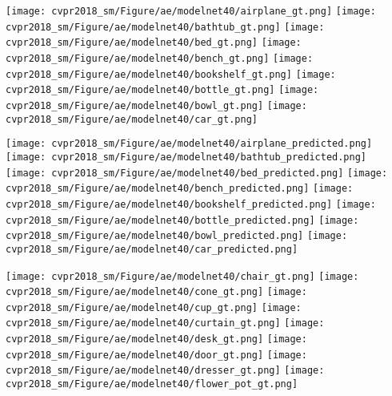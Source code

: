 \documentclass[10pt,twocolumn,letterpaper]{article}
\begin{document}
\begin{figure*}[t] 
        \centering
        
        \texttt{[image: cvpr2018\_sm/Figure/ae/modelnet40/airplane\_gt.png]}
        \texttt{[image: cvpr2018\_sm/Figure/ae/modelnet40/bathtub\_gt.png]}
        \texttt{[image: cvpr2018\_sm/Figure/ae/modelnet40/bed\_gt.png]}
        \texttt{[image: cvpr2018\_sm/Figure/ae/modelnet40/bench\_gt.png]}
        \texttt{[image: cvpr2018\_sm/Figure/ae/modelnet40/bookshelf\_gt.png]}
        \texttt{[image: cvpr2018\_sm/Figure/ae/modelnet40/bottle\_gt.png]}
        \texttt{[image: cvpr2018\_sm/Figure/ae/modelnet40/bowl\_gt.png]}
        \texttt{[image: cvpr2018\_sm/Figure/ae/modelnet40/car\_gt.png]}
        
        \texttt{[image: cvpr2018\_sm/Figure/ae/modelnet40/airplane\_predicted.png]}
        \texttt{[image: cvpr2018\_sm/Figure/ae/modelnet40/bathtub\_predicted.png]}
        \texttt{[image: cvpr2018\_sm/Figure/ae/modelnet40/bed\_predicted.png]}
        \texttt{[image: cvpr2018\_sm/Figure/ae/modelnet40/bench\_predicted.png]}
        \texttt{[image: cvpr2018\_sm/Figure/ae/modelnet40/bookshelf\_predicted.png]}
        \texttt{[image: cvpr2018\_sm/Figure/ae/modelnet40/bottle\_predicted.png]}
        \texttt{[image: cvpr2018\_sm/Figure/ae/modelnet40/bowl\_predicted.png]}
        \texttt{[image: cvpr2018\_sm/Figure/ae/modelnet40/car\_predicted.png]}
        
        \texttt{[image: cvpr2018\_sm/Figure/ae/modelnet40/chair\_gt.png]}
        \texttt{[image: cvpr2018\_sm/Figure/ae/modelnet40/cone\_gt.png]}
        \texttt{[image: cvpr2018\_sm/Figure/ae/modelnet40/cup\_gt.png]}
        \texttt{[image: cvpr2018\_sm/Figure/ae/modelnet40/curtain\_gt.png]}
        \texttt{[image: cvpr2018\_sm/Figure/ae/modelnet40/desk\_gt.png]}
        \texttt{[image: cvpr2018\_sm/Figure/ae/modelnet40/door\_gt.png]}
        \texttt{[image: cvpr2018\_sm/Figure/ae/modelnet40/dresser\_gt.png]}
        \texttt{[image: cvpr2018\_sm/Figure/ae/modelnet40/flower\_pot\_gt.png]}
        

\end{figure*}
\end{document}
